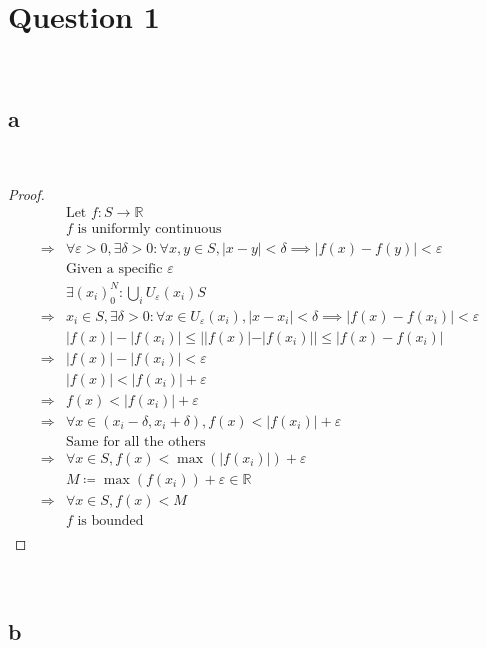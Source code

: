 \documentclass{article}
\begin{document}
\section*{Question 1}

~

\subsection*{a}

~

\begin{proof}
    \begin{align*}
        &\text{Let }f:S\to\mathbb{R}\\
        &f\text{ is uniformly continuous}\\
        \Rightarrow&\forall \varepsilon>0,\exists\delta>0:\forall x,y\in S,|x-y|<\delta\implies |f(x)-f(y)|<\varepsilon\\
        &\text{Given a specific }\varepsilon\\
        &\exists (x_i)_0^N:\bigcup_{i}U_\varepsilon(x_i)S\\
        \Rightarrow&x_i\in S,\exists \delta>0:\forall x\in U_\varepsilon(x_i),|x-x_i|<\delta\implies |f(x)-f(x_i)|<\varepsilon\\
        &|f(x)|-|f(x_i)|\leqslant||f(x)|-|f(x_i)||\leqslant|f(x)-f(x_i)|\\
        \Rightarrow&|f(x)|-|f(x_i)|<\varepsilon\\
        &|f(x)|<|f(x_i)|+\varepsilon\\
        \Rightarrow&f(x)<|f(x_i)|+\varepsilon\\
        \Rightarrow&\forall x\in(x_i-\delta,x_i+\delta),f(x)<|f(x_i)|+\varepsilon\\
        &\text{Same for all the others}\\
        \Rightarrow&\forall x\in S, f(x)<\max(|f(x_i)|)+\varepsilon\\
        &M\coloneqq\max(f(x_i))+\varepsilon\in\mathbb{R}\\
        \Rightarrow&\forall x\in S, f(x)<M\\
        &f\text{ is bounded}\\
    \end{align*}
\end{proof}

~

\subsection*{b}
\end{document}
